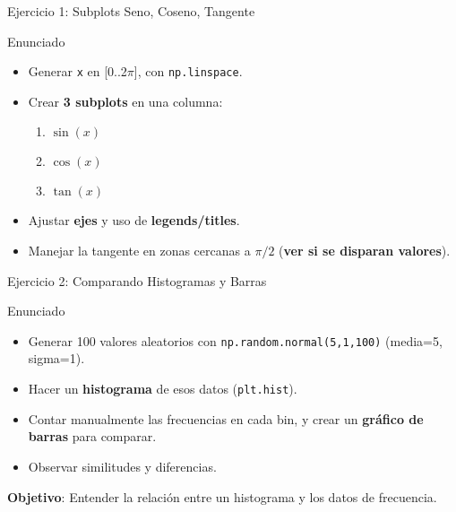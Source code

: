 \documentclass[10pt]{beamer}
\begin{document}
\begin{frame}{Ejercicio 1: Subplots Seno, Coseno, Tangente}
  \begin{block}{Enunciado}
    \begin{itemize}
      \item Generar \texttt{x} en [0..2\(\pi\)], con \texttt{np.linspace}.
      \item Crear \textbf{3 subplots} en una columna:
        \begin{enumerate}
          \item \(\sin(x)\)
          \item \(\cos(x)\)
          \item \(\tan(x)\)
        \end{enumerate}
      \item Ajustar \textbf{ejes} y uso de \textbf{legends/titles}.
      \item Manejar la tangente en zonas cercanas a \(\pi/2\) (\textbf{ver si se disparan valores}).
    \end{itemize}
  \end{block}
\end{frame}

\begin{frame}{Ejercicio 2: Comparando Histogramas y Barras}
  \begin{block}{Enunciado}
    \begin{itemize}
      \item Generar 100 valores aleatorios con \texttt{np.random.normal(5,1,100)} (media=5, sigma=1).
      \item Hacer un \textbf{histograma} de esos datos (\texttt{plt.hist}).
      \item Contar manualmente las frecuencias en cada bin, y crear un \textbf{gráfico de barras} para comparar.
      \item Observar similitudes y diferencias.
    \end{itemize}
  \end{block}
  \textbf{Objetivo}: Entender la relación entre un histograma y los datos de frecuencia.
\end{frame}
\end{document}
